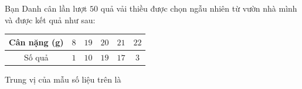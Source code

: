 \begin{ex}
Bạn Danh cân lần lượt $50$ quả vải thiều được chọn ngẫu nhiên từ vườn nhà mình và được kết quả như sau:
\begin{center}
\begin{tabular}{|c|c|c|c|c|c|}\hline
Cân nặng (g) & $8$ & $19$ & $20$ & $21$ & $22$\\\hline
Số quả & $1$ & $10$ & $19$ & $17$ & $3$\\\hline
\end{tabular}
\end{center}
Trung vị của mẫu số liệu trên là
\end{ex}
